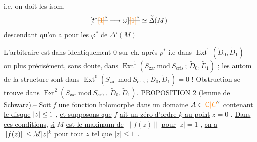 
i.e. on doit   les isom.
\[
[t^*\deleted{\unsure{[1]}}\longrightarrow\omega]\deleted{\unsure{[1]}}\simeq\widetilde\Delta(M)
\]
descendant   qu'on a pour les $\varphi^*$ de $\Delta'(M)$

L'arbitraire est dans  identiquement 0 sur ch.  après $p^*$ i.e dans $\operatorname{Ext}^1(\widetilde D_0,\widetilde D_1)$ ou plus précisément, sans doute, dans $\operatorname{Ext}^1(S_{\mathrm{zar}}\ \mathrm{mod}\ S_{\mathrm{cris}}\,;\,\widetilde D_0,\widetilde D_1)$ ; les autom de la structure sont dans $\operatorname{Ext}^0(S_{\mathrm{zar}}\ \mathrm{mod}\ S_{\mathrm{cris}}\,;\,\widetilde D_0,\widetilde D_1)=0$ ! Obstruction se trouve dans $\operatorname{Ext}^2(S_{\mathrm{zar}}\ \mathrm{mod}\ S_{\mathrm{cris}}\,,\,\widetilde D_0,\widetilde D_1)$.
PROPOSITION 2 (lemme de Schwarz).-- \uline{Soit} $f$ \uline{une fonction holomorphe dans un domaine} $A\handwritten{\subset\unsure{\mathbb C|C}}$ \uline{contenant le disque} $|z|\leq1$ , \uline{et supposons que} $f$ \uline{ait un zéro d'ordre $k$ au point} $z=0$ . \uline{Dans ces conditions}, \uline{si} $M$ \uline{est le maximum de} $\|f(z)\|$ \uline{pour} $|z|=1$ , \uline{on a} $\|f(z)\|\leq M|z|^k$ \uline{pour tout} $z$ \uline{tel que} $|z|\leq1$ .

